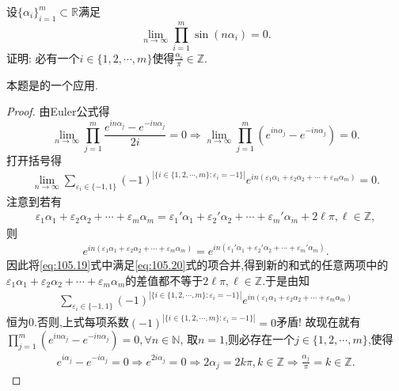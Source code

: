 \documentclass[../../main.tex]{subfiles}%
\begin{document}
\begin{example}
设$\{\alpha_i\}_{i=1}^m\subset\mathbb{R}$满足
\[
\lim_{n\to\infty}\prod_{i=1}^m\sin(n\alpha_i)=0.
\]
证明: 必有一个$i\in\{1,2,\cdots,m\}$使得$\frac{\alpha_i}{\pi}\in\mathbb{Z}$.
\end{example}
\begin{note}
本题是的一个应用.
\end{note}
\begin{proof}

由Euler公式得
\[
\lim_{n\to\infty}\prod_{j=1}^m\frac{e^{in\alpha_j}-e^{-in\alpha_j}}{2i}=0\Rightarrow\lim_{n\to\infty}\prod_{j=1}^m(e^{in\alpha_j}-e^{-in\alpha_j})=0.
\]
打开括号得
\begin{align}\label{eq:105.19}
\lim_{n\to\infty}\sum_{\varepsilon_i\in\{-1,1\}}(-1)^{|\{i\in\{1,2,\cdots,m\}:\varepsilon_i=-1\}|}e^{in(\varepsilon_1\alpha_1+\varepsilon_2\alpha_2+\cdots+\varepsilon_m\alpha_m)}=0.
\end{align}
注意到若有
\begin{align}\label{eq:105.20}
\varepsilon _1\alpha _1+\varepsilon _2\alpha _2+\cdots +\varepsilon _m\alpha _m=\varepsilon _1\prime \alpha _1+\varepsilon _2\prime \alpha _2+\cdots +\varepsilon _m\prime \alpha _m+2\ell \pi ,\ell \in \mathbb{Z} ,
\end{align}
则
\begin{align*}
e^{in\left( \varepsilon _1\alpha _1+\varepsilon _2\alpha _2+\cdots +\varepsilon _m\alpha _m \right)}=e^{in\left( \varepsilon _1\prime \alpha _1+\varepsilon _2\prime \alpha _2+\cdots +\varepsilon _m\prime \alpha _m \right)}.
\end{align*}
因此将\eqref{eq:105.19}式中满足\eqref{eq:105.20}式的项合并,得到新的和式的任意两项中的$\varepsilon _1\alpha _1+\varepsilon _2\alpha _2+\cdots +\varepsilon _m\alpha _m$的差值都不等于$2\ell \pi,\ell \in \mathbb{Z}$.于是由知
\begin{align*}
\sum_{\varepsilon_i\in\{-1,1\}}(-1)^{|\{i\in\{1,2,\cdots,m\}:\varepsilon_i=-1\}|}e^{in(\varepsilon_1\alpha_1+\varepsilon_2\alpha_2+\cdots+\varepsilon_m\alpha_m)}
\end{align*}
恒为0.否则,上式每项系数$(-1)^{|\{i\in\{1,2,\cdots,m\}:\varepsilon_i=-1\}|}=0$矛盾!
故现在就有$\prod_{j=1}^m(e^{in\alpha_j}-e^{-in\alpha_j})=0,\forall n\in\mathbb{N}$, 取$n=1$,则必存在一个$j\in\{1,2,\cdots,m\}$,使得
\begin{align*}
e^{i\alpha _j}-e^{-i\alpha _j}=0\Longrightarrow e^{2i\alpha _j}=0\Longrightarrow 2\alpha _j=2k\pi ,k\in \mathbb{Z} \Longrightarrow \frac{\alpha _j}{\pi}=k\in \mathbb{Z} .
\end{align*}

\end{proof}
\end{document}
